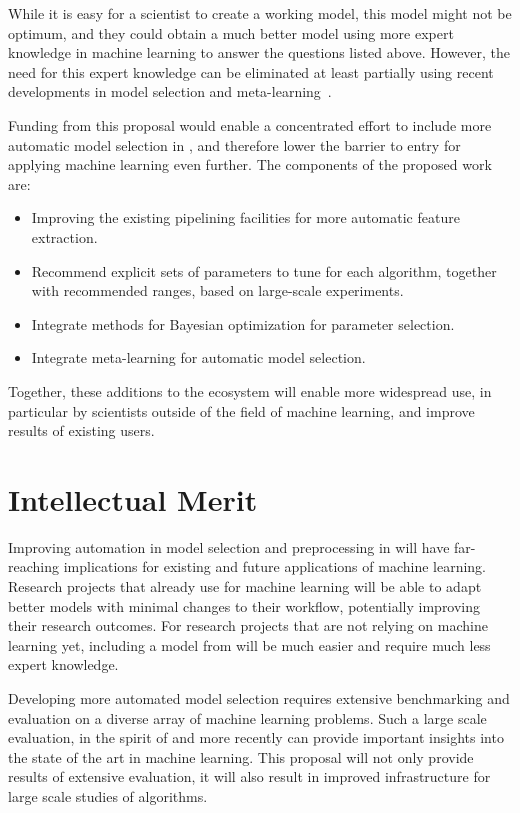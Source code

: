While it is easy for a scientist to create a working model, this model might not
be optimum, and they could obtain a much better model using more expert knowledge
in machine learning to answer the questions listed above.
However, the need for this expert knowledge can be eliminated at least partially
using recent developments in model selection and
meta-learning~\cite{bergstra2013hyperopt, NIPS2011_4443,
feurer-nips2015, snoek2015scalable, NIPS2012_4522}.

Funding from this proposal would enable a concentrated effort to include more
automatic model selection in \sklearn{}, and therefore lower the barrier to
entry for applying machine learning even further.
The components of the proposed work are:
\begin{itemize}
    \item Improving the existing pipelining facilities for more automatic feature extraction.
    \item Recommend explicit sets of parameters to tune for each algorithm,
        together with recommended ranges, based on large-scale experiments.
    \item Integrate methods for Bayesian optimization for parameter selection.
    \item Integrate meta-learning for automatic model selection.
\end{itemize}
Together, these additions to the \sklearn{} ecosystem will enable more widespread use,
in particular by scientists outside of the field of machine learning, and improve results
of existing users.

\section{Intellectual Merit}
Improving automation in model selection and preprocessing in \sklearn{} will have far-reaching
implications for existing and future applications of machine learning.
Research projects that already use \sklearn{} for machine learning will be able to adapt better
models with minimal changes to their workflow, potentially improving their research outcomes.
For research projects that are not relying on machine learning yet, including a model
from \sklearn{} will be much easier and require much less expert knowledge.

Developing more automated model selection requires extensive benchmarking and evaluation
on a diverse array of machine learning problems. Such a large scale evaluation,
in the spirit of \textcite{caruana2008empirical, caruana2006empirical} and more
recently \textcite{feurer-nips2015} can provide important insights into the state
of the art in machine learning. This proposal will not only provide results of
extensive evaluation, it will also result in improved infrastructure
for large scale studies of algorithms.

